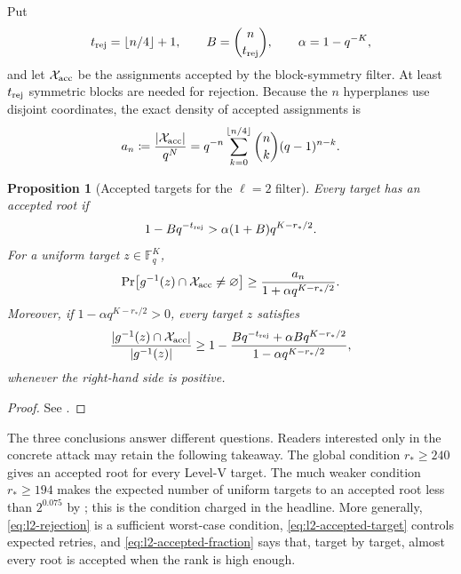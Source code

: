 \documentclass[11pt]{article}
\newtheorem{proposition}[proposition]{Proposition}
\newcommand{\F}{\mathbb F}
\begin{document}
Put
\[
 t_{\rm rej}=\lfloor n/4\rfloor+1,
 \qquad B=\binom n{t_{\rm rej}},
 \qquad \alpha=1-q^{-K},
\]
and let $\mathcal X_{\rm acc}$ be the assignments accepted by the block-symmetry filter.
At least $t_{\rm rej}$ symmetric blocks are needed for rejection.  Because
the $n$ hyperplanes use disjoint coordinates, the exact density of accepted
assignments is
\begin{equation}\label{eq:l2-accepted-density}
 a_n\coloneqq\frac{|\mathcal X_{\rm acc}|}{q^N}
 =q^{-n}\sum_{k=0}^{\lfloor n/4\rfloor}\binom nk(q-1)^{n-k}.
\end{equation}

\begin{proposition}[Accepted targets for the $\ell=2$ filter]\label{prop:l2-rejection}
Every target has an accepted root if
\begin{equation}\label{eq:l2-rejection}
 1-Bq^{-t_{\rm rej}}>\alpha(1+B)q^{K-r_*/2}.
\end{equation}
For a uniform target $z\in\F_q^K$,
\begin{equation}\label{eq:l2-accepted-target}
 \Pr\bigl[g^{-1}(z)\cap\mathcal X_{\rm acc}\ne\varnothing\bigr]
 \ge \frac{a_n}{1+\alpha q^{K-r_*/2}}.
\end{equation}
Moreover, if $1-\alpha q^{K-r_*/2}>0$, every target $z$ satisfies
\begin{equation}\label{eq:l2-accepted-fraction}
 \frac{|g^{-1}(z)\cap\mathcal X_{\rm acc}|}{|g^{-1}(z)|}
 \ge
 1-\frac{Bq^{-t_{\rm rej}}+\alpha Bq^{K-r_*/2}}
          {1-\alpha q^{K-r_*/2}},
\end{equation}
whenever the right-hand side is positive.
\end{proposition}

\begin{proof}
See .
\end{proof}

The three conclusions answer different questions.  Readers interested only
in the concrete attack may retain the following takeaway.  The global
condition $r_*\ge240$ gives an accepted root for every Level-V target.  The
much weaker condition $r_*\ge194$ makes the expected number of uniform targets
to an accepted root less than $2^{0.075}$ by
; this is the condition charged in the headline.
More generally, \eqref{eq:l2-rejection} is a sufficient worst-case condition,
\eqref{eq:l2-accepted-target} controls expected retries, and
\eqref{eq:l2-accepted-fraction} says that, target by target, almost every root
is accepted when the rank is high enough.
\end{document}
